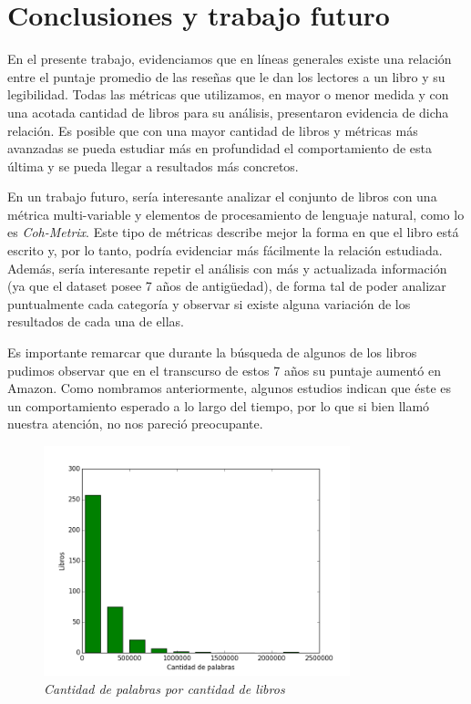 \documentclass[12pt,journal,compsoc]{IEEEtran}
\begin{document}
\section{Conclusiones y trabajo futuro}\label{sec:conclusion} 

En el presente trabajo, evidenciamos que en líneas generales existe una relación entre el puntaje promedio de las reseñas que le dan los lectores a un libro y su legibilidad. Todas las métricas que utilizamos, en mayor o menor medida y con una acotada cantidad de libros para su análisis, presentaron evidencia de dicha relación. Es posible que con una mayor cantidad de libros y métricas más avanzadas se pueda estudiar más en profundidad el comportamiento de esta última y se pueda llegar a resultados más concretos.

En un trabajo futuro, sería interesante analizar el conjunto de libros con una métrica multi-variable y elementos de procesamiento de lenguaje natural, como lo es \textit{Coh-Metrix}\cite{graesser}. Este tipo de métricas describe mejor la forma en que el libro está escrito y, por lo tanto, podría evidenciar más fácilmente la relación estudiada. Además, sería interesante repetir el análisis con más y actualizada información (ya que el dataset posee 7 años de antigüedad), de forma tal de poder analizar puntualmente cada categoría y observar si existe alguna variación de los resultados de cada una de ellas.

Es importante remarcar que durante la búsqueda de algunos de los libros pudimos observar que en el transcurso de estos 7 años su puntaje aumentó en Amazon. Como nombramos anteriormente, algunos estudios indican que éste es un comportamiento esperado a lo largo del tiempo\cite{zhang}, por lo que si bien llamó nuestra atención, no nos pareció preocupante.

\begin{figure}[H]
\begin{center}
  \includegraphics[width=3.5in]{../unigrams/scripts/histogram/histogramaDePalabras.png}
  \caption{\small \textit{Cantidad de palabras por cantidad de libros}}
  \label{fig:cantPalabrasVsCantLibros}
  \end{center}
\end{figure}
\end{document}

